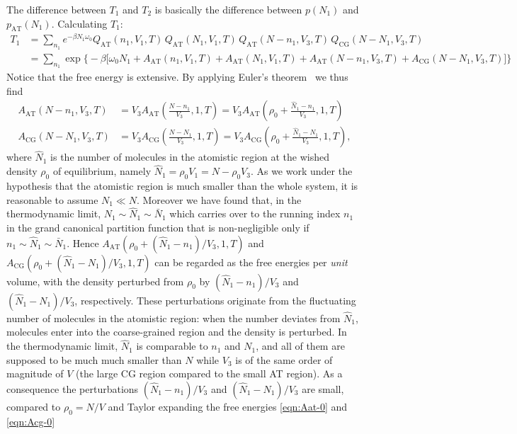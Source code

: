 \documentclass[aps,a4paper,reprint,onecolumn]{revtex4}
\newcommand{\AT}{{\textrm{{AT}}}}
\newcommand{\CG}{{\textrm{CG}}}
\begin{document}
The difference between $T_1$ and $T_2$ is basically the difference
between $p(N_1)$ and $p_{\AT}(N_1)$.
Calculating $T_1$:
\begin{align}\nonumber
  T_1
  &=
  \sum_{n_1}
  e^{-\beta N_1\omega_0}
  Q_{\AT}(n_1,V_1,T)\,
  Q_{\AT}(N_1,V_1,T)\,
  Q_{\AT}(N-n_1,V_3,T)\,
  Q_{\CG}(N-N_1,V_3,T) \\\label{eqn:t1-1}
  &=
  \sum_{n_1}
  \exp
  \big\{-\beta
  \big[
  \omega_0N_1 +
  A_{\AT}(n_1,V_1,T) +
  A_{\AT}(N_1,V_1,T) +
  A_{\AT}(N-n_1,V_3,T) +
  A_{\CG}(N-N_1,V_3,T)
  \big]
  \big\}
\end{align}
Notice that the free energy is extensive.
By applying Euler's theorem~\cite{tuckeman2010statistical} we thus find 
\begin{align}\label{eqn:Aat-0}
  A_{\AT}(N-n_1,V_3,T)
  &= V_3 A_{\AT}(\frac{N-n_1}{V_3},1,T)
  = V_3 A_{\AT}(\rho_0 + \frac{\hat N_1 - n_1}{V_3},1,T)\\\label{eqn:Acg-0}
  A_{\CG}(N-N_1,V_3,T)
  &= V_3 A_{\CG}(\frac{N-N_1}{V_3},1,T)
  = V_3 A_{\CG}(\rho_0 + \frac{\hat N_1 - N_1}{V_3},1,T),
\end{align}
where $\hat N_1$ is the number of molecules in the atomistic region
at the wished density $\rho_0$ of equilibrium, namely
$\hat N_1 = \rho_0V_1 = N - \rho_0 V_3$. As we work under the hypothesis that the atomistic region is much smaller than the whole system, it
is reasonable to assume $N_1\ll N$. Moreover we have found that, in the thermodynamic limit, $N_{1}\sim\hat N_1\sim\bar N_1$ which carries over to the running index $n_{1}$  in the grand canonical partition function that is non-negligible only if $n_{1}\sim\hat N_1\sim\bar N_1$. Hence 
$A_{\AT}(\rho_0 + (\hat N_1 - n_1)/{V_3},1,T)$ and
$A_{\CG}(\rho_0 + (\hat N_1 - N_1)/{V_3},1,T)$ can be regarded as
the free energies per \emph{unit} volume, with
the density perturbed from $\rho_0$ by  $(\hat N_1 - n_1)/{V_3}$
and $(\hat N_1 - N_1)/{V_3}$, respectively.
These perturbations originate from the fluctuating
number of molecules in the atomistic region: when the number
deviates from $\hat N_1$, molecules enter into the coarse-grained
region and the density is perturbed.
In the thermodynamic
limit, $\hat N_1$ is comparable to $n_1$ and $N_1$, and all of them are
supposed to be much much smaller than $N$ while $V_3$ is of the same order of magnitude of $V$ (the large CG region compared to the small AT region). As a consequence the perturbations
$(\hat N_1 - n_1)/{V_3}$ and $(\hat N_1 - N_1)/{V_3}$ are small, compared to $\rho_0 = N/V$ and
Taylor expanding the free energies \eqref{eqn:Aat-0} and \eqref{eqn:Acg-0}
\end{document}
